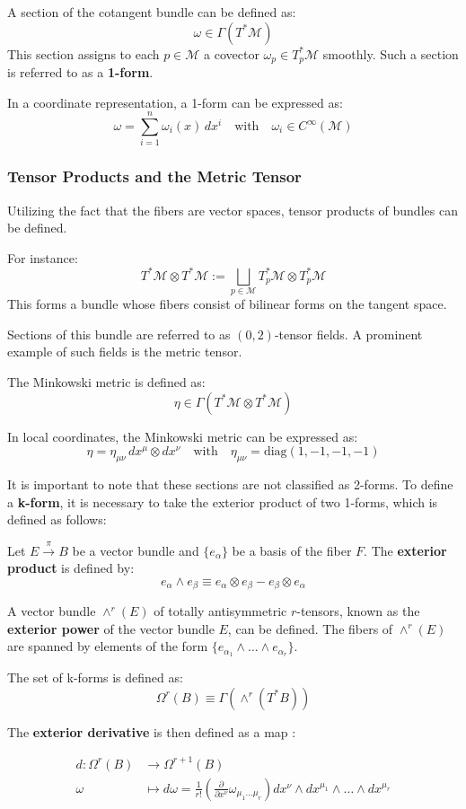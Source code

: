 A section of the cotangent bundle can be defined as:
\[
\omega \in \Gamma(T^* \mathcal{M})
\]
This section assigns to each \(p \in \mathcal{M}\) a covector \(\omega_p \in T_p^*\mathcal{M}\) smoothly. Such a section is referred to as a \textbf{1-form}.

In a coordinate representation, a 1-form can be expressed as:
\[
\omega = \sum_{i=1}^n \omega_i(x) \, dx^i
\quad \text{with} \quad \omega_i \in C^\infty(\mathcal{M})
\]

\subsubsection*{Tensor Products and the Metric Tensor}

Utilizing the fact that the fibers are vector spaces, tensor products of bundles can be defined.

For instance:
\[
T^*\mathcal{M} \otimes T^*\mathcal{M} := \bigsqcup_{p \in \mathcal{M}} T_p^*\mathcal{M} \otimes T_p^*\mathcal{M}
\]
This forms a bundle whose fibers consist of bilinear forms on the tangent space.

Sections of this bundle are referred to as \((0,2)\)-tensor fields. A prominent example of such fields is the metric tensor.

The Minkowski metric is defined as:
\[
\eta \in \Gamma(T^*\mathcal{M} \otimes T^*\mathcal{M})
\]

In local coordinates, the Minkowski metric can be expressed as:
\[
\eta = \eta_{\mu\nu} \, dx^\mu \otimes dx^\nu
\quad \text{with} \quad \eta_{\mu\nu} = \text{diag}(1, -1, -1, -1)
\]

It is important to note that these sections are not classified as 2-forms. To define a \textbf{k-form}, it is necessary to take the exterior product of two 1-forms, which is defined as follows:

Let \(E \xrightarrow{\pi} B\) be a vector bundle and \(\{e_\alpha\}\) be a basis of the fiber \(F\). The \textbf{exterior product} is defined by:
\[e_\alpha \wedge e_\beta \equiv e_\alpha \otimes e_\beta - e_\beta \otimes e_\alpha\]

A vector bundle \(\wedge^r (E)\) of totally antisymmetric \(r\)-tensors, known as the \textbf{exterior power} of the vector bundle \(E\), can be defined. The fibers of \(\wedge^r (E)\) are spanned by elements of the form \(\{ e_{\alpha_1} \wedge \dots \wedge e_{\alpha_r} \}\).

The set of k-forms is defined as:
\[\Omega^r(B) \equiv \Gamma(\wedge^r (T^*B))\]

The \textbf{exterior derivative} is then defined as a map \cite{NakaharaGeometrytopologyphysics2005}:

\begin{align*}
  d: \Omega^r(B) &\to \Omega^{r+1}(B) \\
  \omega &\mapsto d\omega = \frac{1}{r!}\left( \frac{\partial}{ \partial x^\nu} \omega_{\mu_1 \dots \mu_r} \right) dx^\nu \wedge dx^{\mu_1} \wedge \dots \wedge dx^{\mu_r}
\end{align*}

